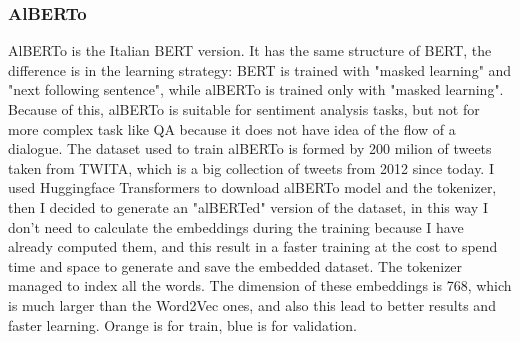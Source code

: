 \documentclass{article}
\begin{document}
            \subsubsection{AlBERTo}
            AlBERTo is the Italian BERT version.
            It has the same structure of BERT, the difference is in the learning strategy: BERT is trained with "masked learning" and "next following sentence", while alBERTo is trained only with "masked learning".
            Because of this, alBERTo is suitable for sentiment analysis tasks, but not for more complex task like QA because it does not have idea of the flow of a dialogue.
            The dataset used to train alBERTo is formed by 200 milion of tweets taken from TWITA, which is a big collection of tweets from 2012 since today.
            I used Huggingface Transformers to download alBERTo model and the tokenizer, then I decided to generate an "alBERTed" version of the dataset,
            in this way I don't need to calculate the embeddings during the training because I have already computed them,
            and this result in a faster training at the cost to spend time and space to generate and save the embedded dataset.
            The tokenizer managed to index all the words.
            The dimension of these embeddings is 768, which is much larger than the Word2Vec ones, and also this lead to better results and faster learning.
            \color{orange} Orange is for train, \color{blue} blue is for validation.\color{black}
\end{document}
